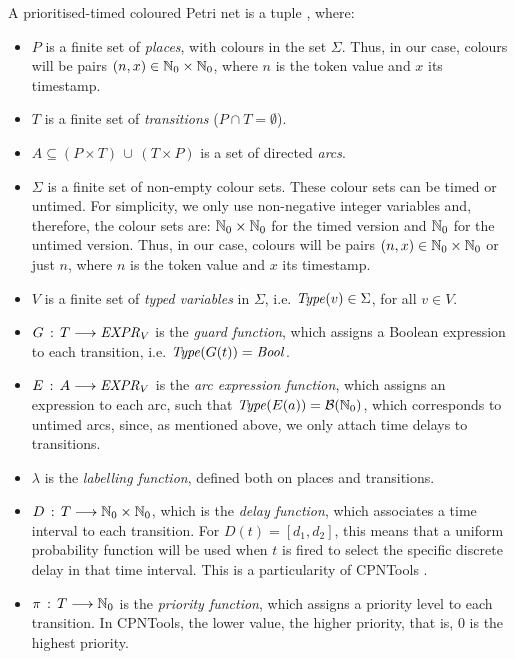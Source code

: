 \begin{definition} \label{ptcpndef}
A prioritised-timed coloured Petri net is a tuple \ptcpntuple, where: %
\begin{itemize}
\item $P$ is a finite set of {\em places}, with colours
in the set $\Sigma$. Thus, in our case, colours 
will be pairs $(n,x)\in \mathbb{N}_{0} \times \mathbb{N}_{0}$, where $n$ is
the token value and $x$ its timestamp.
%
\item $T$ is a finite set of {\em transitions} ($P\cap T = \emptyset$).
%
\item $A \subseteq (P\times T)\,\cup\,(T \times P)$ is a
set of directed {\em arcs}.
%
\item $\Sigma$ is a finite set of non-empty colour sets. These colour sets can be timed or untimed. For simplicity,
we only use non-negative integer variables and, therefore, the colour sets are: 
$\mathbb{N}_{0} \times \mathbb{N}_{0}$ for the timed version and $\mathbb{N}_{0}$ for the untimed version. Thus, in our case, colours 
will be pairs $(n,x)\in \mathbb{N}_{0} \times \mathbb{N}_{0}$ or just $n$, where $n$ is
the token value and $x$ its timestamp.
%
\item $V$ is a finite set of {\em typed variables} in $\Sigma$, 
i.e. ${\it Type}(v) \in \Sigma$, for all $v \in V$.
%
%
\item $G\,:\, T \longrightarrow {\it EXPR}_V$ is the
{\em guard function}, which assigns a Boolean
expression
to each transition, i.e. ${\it Type}(G(t))={\it Bool}$. 
%
\item $E\,:\, A \longrightarrow {\it EXPR}_V$ is the
{\em arc expression function}, which assigns an expression
to each arc, such that ${\it Type}(E(a)) = {\cal B}(\mathbb{N}_{0})$,
which corresponds to untimed arcs, since, as mentioned above,
we only attach time delays to transitions.

\item $\lambda$ is the {\em labelling function}, defined
both on places and transitions.

\item $D\,:\,T \longrightarrow \mathbb{N}_{0} \times \mathbb{N}_{0}$, which
is the {\em delay function}, which associates a time
interval to each transition. For $D(t)=[d_1,d_2]$,
this means that a uniform probability function will
be used when $t$ is fired to select the specific discrete
delay in that time interval. This is a particularity of CPNTools \cite{CPNTools}.
%
\item $\pi\,:\,T \longrightarrow \mathbb{N}_{0}$ is the
{\em priority function}, which assigns a priority level
to each transition. In CPNTools, the lower value, the higher priority, that is, $0$ is the highest priority.
\end{itemize}


\end{definition}
